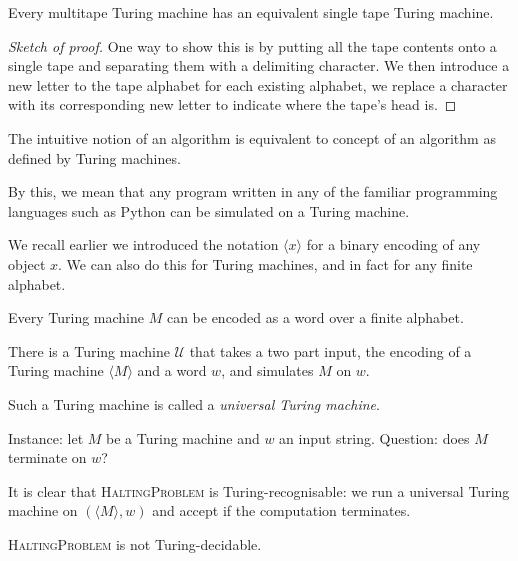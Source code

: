 \begin{theorem}
  Every multitape Turing machine has an equivalent single tape Turing machine.
\end{theorem}

\begin{proof}[Sketch of proof]
  One way to show this is by putting all the tape contents onto a single tape and separating them with a delimiting character. We then introduce a new letter to the tape alphabet for each existing alphabet, we replace a character with its corresponding new letter to indicate where the tape's head is.
\end{proof}

\begin{theorem}
  The intuitive notion of an algorithm is equivalent to concept of an algorithm as defined by Turing machines.
\end{theorem}

By this, we mean that any program written in any of the familiar programming languages such as Python can be simulated on a Turing machine. 

We recall earlier we introduced the notation $\langle x \rangle$ for a binary encoding of any object $x$. We can also do this for Turing machines, and in fact for any finite alphabet. 

\begin{proposition}
  Every Turing machine $M$ can be encoded as a word over a finite alphabet.
\end{proposition}

\begin{theorem}
  There is a Turing machine $\mathcal U$ that takes a two part input, the encoding of a Turing machine $\langle M \rangle$ and a word $w$, and simulates $M$ on $w$.
\end{theorem}

Such a Turing machine is called a \emph{universal Turing machine}. 

\begin{problem}
  Instance: let $M$ be a Turing machine and $w$ an input string. \newline 
  Question: does $M$ terminate on $w$? 
\end{problem}

It is clear that \textsc{HaltingProblem} is Turing-recognisable: we run a universal Turing machine on $(\langle M \rangle, w)$ and accept if the computation terminates.

\begin{proposition}
  \textsc{HaltingProblem} is not Turing-decidable.
\end{proposition}

